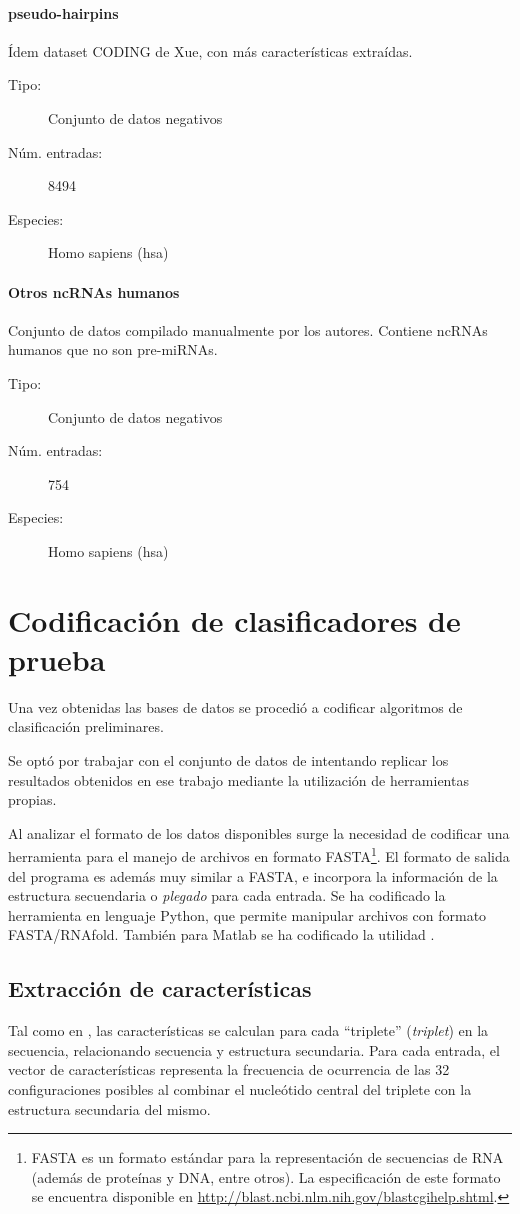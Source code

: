 \documentclass[12pt,bibliography=oldstyle,DIV=12,parskip=half-,titlepage]{scrartcl}
\begin{document}
\paragraph{pseudo-hairpins}
Ídem dataset CODING de Xue, con más características extraídas.
\begin{description}
\item[Tipo:] Conjunto de datos negativos
\item[Núm. entradas:] 8494
\item[Especies:] Homo sapiens (hsa)
\end{description}
%
\paragraph{Otros ncRNAs humanos}
Conjunto de datos compilado manualmente por los autores. Contiene
ncRNAs humanos que no son pre-miRNAs.
\begin{description}
\item[Tipo:] Conjunto de datos negativos
\item[Núm. entradas:] 754
\item[Especies:] Homo sapiens (hsa)
\end{description}
%
%
%
%
\section{Codificación de clasificadores de prueba}
%
Una vez obtenidas las bases de datos se procedió a codificar
algoritmos de clasificación preliminares.

Se optó por trabajar con el conjunto de datos de \cite{xue}
intentando replicar los resultados obtenidos en ese trabajo mediante
la utilización de herramientas propias.

Al analizar el formato de los datos disponibles surge la necesidad
de codificar una herramienta para el manejo de archivos en formato
FASTA\footnote{FASTA es un formato estándar para la representación
  de secuencias de RNA (además de proteínas y DNA, entre otros).
  La especificación de este formato se encuentra disponible en
  \url{http://blast.ncbi.nlm.nih.gov/blastcgihelp.shtml}.}.
El formato de salida del programa  es además
muy similar a FASTA, e incorpora la información de la estructura
secuendaria o \emph{plegado} para cada entrada.
%
Se ha codificado la herramienta  en lenguaje Python,
que permite manipular archivos con formato FASTA/RNAfold. También para
Matlab se ha codificado la utilidad .
%
\subsection{Extracción de características}
%
Tal como en \cite{xue}, las características se calculan para cada
``triplete'' (\emph{triplet}) en la secuencia, relacionando secuencia
y estructura secundaria. Para cada entrada, el vector de
características representa la frecuencia de ocurrencia de las 32
configuraciones posibles al combinar el nucleótido central del
triplete con la estructura secundaria del mismo.
\end{document}
